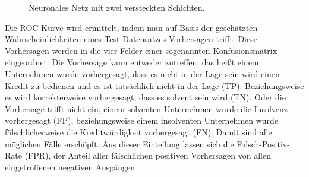 \documentclass{article}
\begin{document}
\begin{figure}
\centering
\caption{Neuronales Netz mit zwei versteckten Schichten.}
\label{NN2L}
\vspace{2mm}
\end{figure}


Die ROC-Kurve wird ermittelt, indem man auf Basis der gesch{\"a}tzten Wahrscheinlichkeiten eines Test-Datensatzes Vorhersagen trifft. Diese Vorhersagen werden in die vier Felder einer sogenannten Konfusionsmatrix eingeordnet. Die Vorhersage kann entweder zutreffen, das hei{\ss}t einem Unternehmen wurde vorhergesagt, dass es nicht in der Lage sein wird einen Kredit zu bedienen und es ist tats{\"a}chlich nicht in der Lage (TP). Beziehungsweise es wird korrekterweise vorhergesagt, dass es solvent sein wird (TN). Oder die Vorhersage trifft nicht ein, einem solventen Unternehmen wurde die Insolvenz vorhergesagt (FP), beziehungsweise einem insolventen Unternehmen wurde f{\"a}lschlicherweise die Kreditw{\"u}rdigkeit vorhergesagt (FN). Damit sind alle m{\"o}glichen F{\"a}lle ersch{\"o}pft. Aus dieser Einteilung lassen sich die Falsch-Positiv-Rate (FPR), der Anteil aller f{\"a}lschlichen positiven Vorhersagen von allen eingetroffenen negativen Ausg{\"a}ngen
\end{document}
